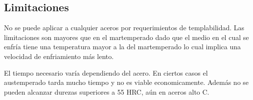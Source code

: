 \subsection{Limitaciones}
No se puede aplicar a cualquier aceros por requerimientos de templabilidad. Las limitaciones son mayores que en el martemperado dado que el medio en el cual se enfría tiene una temperatura mayor a la del martemperado lo cual implica una velocidad de enfriamiento más lento.

El tiempo necesario varía dependiendo del acero. En ciertos casos el austemperado tarda mucho tiempo y no es viable economicamente. Además no se pueden alcanzar durezas superiores a 55 HRC, aún en aceros alto C.